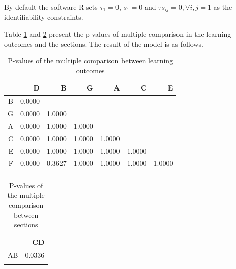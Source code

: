 \documentclass[12pt,nohyper]{tufte-handout}\usepackage[]{graphicx}\usepackage[]{color}
\begin{document}
By default the software R sets $\tau_{1}=0$, $s_{1}=0$ and 
$\tau s_{ij}=0, \forall i,j = 1 $ as the identifiability constraints.

Table \ref{tab:pvalues_obj} and \ref{tab:pvalues_sec} present the p-values 
of multiple comparison in the learning outcomes and the sections. 
The result of the model is as follows.

\begin{longtable}{rrrrrrr}
  \hline
 & D & B & G & A & C & E \\ 
  \hline
B & 0.0000 &  &  &  &  &  \\ 
  G & 0.0000 & 1.0000 &  &  &  &  \\ 
  A & 0.0000 & 1.0000 & 1.0000 &  &  &  \\ 
  C & 0.0000 & 1.0000 & 1.0000 & 1.0000 &  &  \\ 
  E & 0.0000 & 1.0000 & 1.0000 & 1.0000 & 1.0000 &  \\ 
  F & 0.0000 & 0.3627 & 1.0000 & 1.0000 & 1.0000 & 1.0000 \\ 
   \hline
\hline
\caption{P-values of the multiple comparison between learning outcomes} 
\label{tab:pvalues_obj}
\end{longtable}
\begin{longtable}{rr}
  \hline
 & CD \\ 
  \hline
AB & 0.0336 \\ 
   \hline
\hline
\caption{P-values of the multiple comparison between sections} 
\label{tab:pvalues_sec}
\end{longtable}
\end{document}
